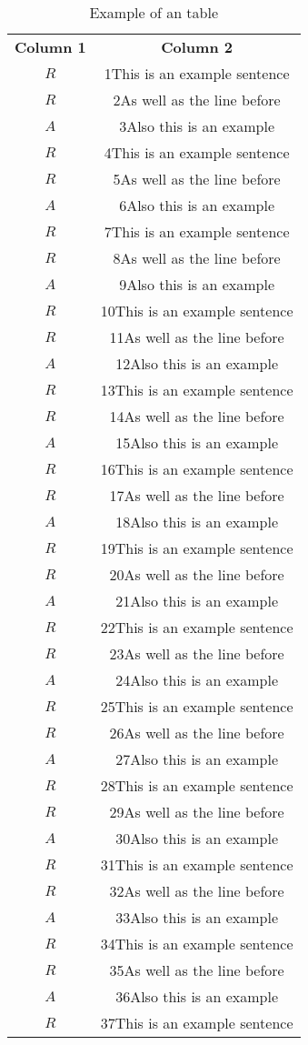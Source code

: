 \begin{longtable}{cc}  
	\caption{Example of an table} \\
	\textbf{Column 1} & \textbf{Column 2} \\[6pt]
	$R$ & 1This is an example sentence \\[6pt]
	$R$ & 2As well as the line before \\[6pt]
	$A$ & 3Also this is an example \\[6pt]
	$R$ & 4This is an example sentence \\[6pt]
	$R$ & 5As well as the line before \\[6pt]
	$A$ & 6Also this is an example \\[6pt]
	$R$ & 7This is an example sentence \\[6pt]
	$R$ & 8As well as the line before \\[6pt]
	$A$ & 9Also this is an example \\[6pt]
	$R$ & 10This is an example sentence \\[6pt]
	$R$ & 11As well as the line before \\[6pt]
	$A$ & 12Also this is an example \\[6pt]
	$R$ & 13This is an example sentence \\[6pt]
	$R$ & 14As well as the line before \\[6pt]
	$A$ & 15Also this is an example \\[6pt]
	$R$ & 16This is an example sentence \\[6pt]
	$R$ & 17As well as the line before \\[6pt]
	$A$ & 18Also this is an example \\[6pt]
	$R$ & 19This is an example sentence \\[6pt]
	$R$ & 20As well as the line before \\[6pt]
	$A$ & 21Also this is an example \\[6pt]
	$R$ & 22This is an example sentence \\[6pt]
	$R$ & 23As well as the line before \\[6pt]
	$A$ & 24Also this is an example \\[6pt]
	$R$ & 25This is an example sentence \\[6pt]
	$R$ & 26As well as the line before \\[6pt]
	$A$ & 27Also this is an example \\[6pt]
	$R$ & 28This is an example sentence \\[6pt]
	$R$ & 29As well as the line before \\[6pt]
	$A$ & 30Also this is an example \\[6pt]
	$R$ & 31This is an example sentence \\[6pt]
	$R$ & 32As well as the line before \\[6pt]
	$A$ & 33Also this is an example \\[6pt]
	$R$ & 34This is an example sentence \\[6pt]
	$R$ & 35As well as the line before \\[6pt]
	$A$ & 36Also this is an example \\[6pt]
	$R$ & 37This is an example sentence \\[6pt]
\end{longtable} 
